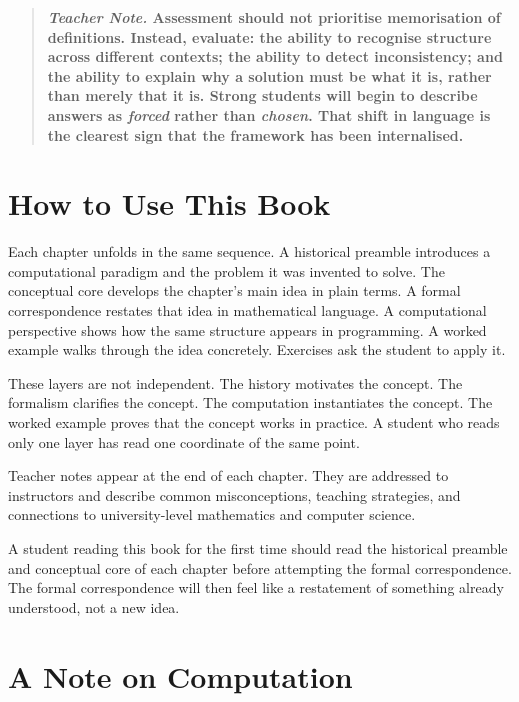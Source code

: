 \documentclass[11pt]{book}
\theoremstyle{plain}
\theoremstyle{definition}
\theoremstyle{remark}
\newenvironment{teachernote}
  {\begin{quote}\small\bfseries\textit{Teacher Note.}\normalfont\small\enspace\ignorespaces}
  {\end{quote}}
\begin{document}
\begin{teachernote}
Assessment should not prioritise memorisation of definitions. Instead,
evaluate: the ability to recognise structure across different contexts;
the ability to detect inconsistency; and the ability to explain why a
solution must be what it is, rather than merely that it is. Strong
students will begin to describe answers as \emph{forced} rather than
\emph{chosen}. That shift in language is the clearest sign that the
framework has been internalised.
\end{teachernote}

\chapter*{How to Use This Book}

Each chapter unfolds in the same sequence. A historical preamble
introduces a computational paradigm and the problem it was invented to
solve. The conceptual core develops the chapter's main idea in plain
terms. A formal correspondence restates that idea in mathematical
language. A computational perspective shows how the same structure
appears in programming. A worked example walks through the idea
concretely. Exercises ask the student to apply it.

These layers are not independent. The history motivates the concept. The
formalism clarifies the concept. The computation instantiates the
concept. The worked example proves that the concept works in practice.
A student who reads only one layer has read one coordinate of the same
point.

Teacher notes appear at the end of each chapter. They are addressed to
instructors and describe common misconceptions, teaching strategies, and
connections to university-level mathematics and computer science.

A student reading this book for the first time should read the
historical preamble and conceptual core of each chapter before
attempting the formal correspondence. The formal correspondence will
then feel like a restatement of something already understood, not a new
idea.

\chapter*{A Note on Computation}
\end{document}
